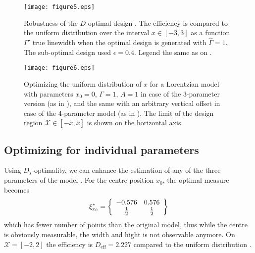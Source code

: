 \documentclass[12pt]{iopart}
\begin{document}
\begin{figure}
\texttt{[image: figure5.eps]}
\caption{Robustness of the $D$-optimal design . The efficiency is compared to the uniform distribution over the interval $x\in [-3,3]$ as a function $\Gamma'$ true linewidth when the optimal design is generated with $\hat \Gamma = 1$. The sub-optimal design used $\epsilon = 0.4$. Legend the same as on .}
\label{fig:grobust}
\end{figure}

\begin{figure}
\texttt{[image: figure6.eps]}
\caption{Optimizing the uniform distribution of $x$ for a Lorentzian model with parameters $x_0=0$, $\Gamma = 1$, $A = 1$ in case of the 3-parameter version (as in ), and the same with an arbitrary vertical offset in case of the 4-parameter model (as in ). The limit of the design region $\mathcal{X} \in [-\tilde x, \tilde x]$ is shown on the horizontal axis.}
\label{fig:optimaluniform}
\end{figure}


\subsection{Optimizing for individual parameters}
\label{seq:exopts}

Using $D_s$-optimality, we can enhance the estimation of any of the three parameters of the model . For the centre position $x_0$, the optimal measure becomes
\begin{equation}
\xi^*_{x_0} = \left\{
  \begin{array}{c c}
    -0.576 & 0.576 \\
    \frac{1}{2} & \frac{1}{2}\\
  \end{array} \right \}
\end{equation}
which has fewer number of points than the original model, thus while the centre is obviously measurable, the width and hight is not observable anymore.  On $\mathcal{X} = [-2,2]$ the efficiency is $D_\mathrm{eff} = 2.227$ compared to the uniform distribution .
\end{document}
